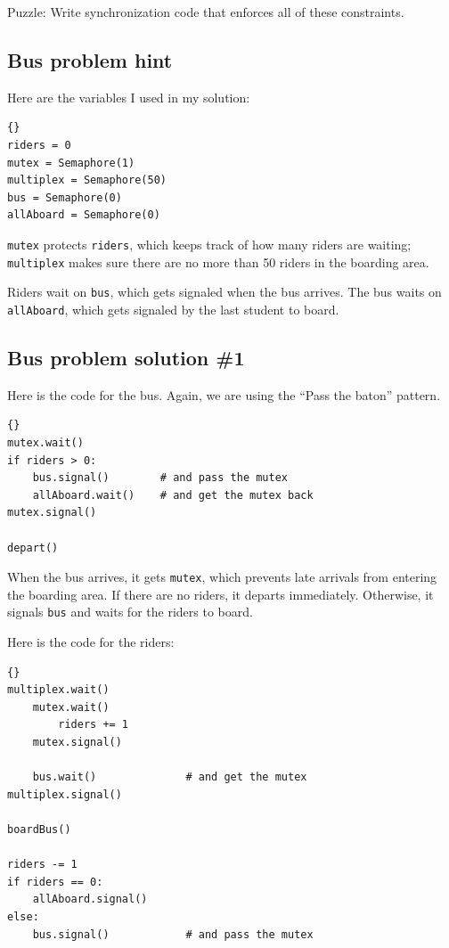 \documentclass{book}
\newcommand{\clearemptydoublepage}{\newpage\cleardoublepage}
\begin{document}
Puzzle: Write synchronization code that enforces all of these
constraints.


\clearemptydoublepage
\subsection {Bus problem hint}

Here are the variables I used in my solution:

\begin{lstlisting}[title={Bus problem hint}]{}
riders = 0
mutex = Semaphore(1)
multiplex = Semaphore(50)
bus = Semaphore(0)
allAboard = Semaphore(0)
\end{lstlisting}

{\tt mutex} protects {\tt riders}, which keeps track of
how many riders are waiting;
{\tt multiplex} makes sure there are no more than 50 riders
in the boarding area.

Riders wait on
{\tt bus}, which gets signaled when the bus arrives.  The
bus waits on {\tt allAboard}, which gets signaled by the last
student to board.


\clearemptydoublepage
\subsection {Bus problem solution \#1}

Here is the code for the bus.  Again, we are using the
``Pass the baton'' pattern.

\begin{lstlisting}[title={Bus problem solution (bus)}]{}
mutex.wait()
if riders > 0:
    bus.signal()        # and pass the mutex
    allAboard.wait()    # and get the mutex back
mutex.signal()

depart()
\end{lstlisting}

When the bus arrives, it gets {\tt mutex}, which
prevents late arrivals from entering the boarding area.  If there
are no riders, it departs immediately.  Otherwise, it signals {\tt bus}
and waits for the riders to board.

Here is the code for the riders:

\begin{lstlisting}[title={Bus problem solution (riders)}]{}
multiplex.wait()
    mutex.wait()
        riders += 1
    mutex.signal()

    bus.wait()              # and get the mutex
multiplex.signal()

boardBus()

riders -= 1
if riders == 0:
    allAboard.signal() 
else:
    bus.signal()            # and pass the mutex
\end{lstlisting}
\end{document}
